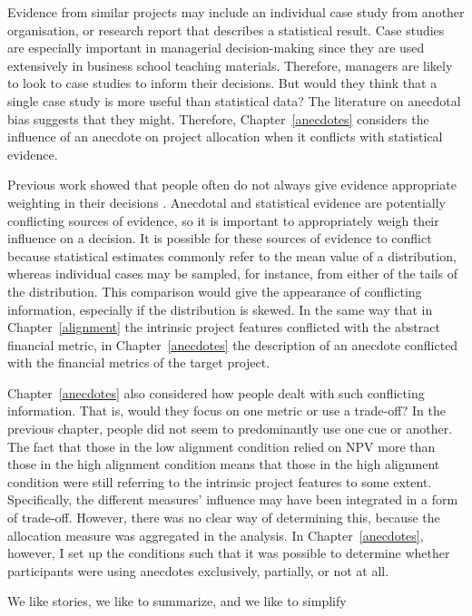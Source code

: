 \documentclass[a4paper, nobind, dvipsnames]{templates/ociamthesis}
\theoremstyle{definition}
\theoremstyle{definition}
\theoremstyle{definition}
\theoremstyle{definition}
\theoremstyle{remark}
\begin{document}
Evidence from similar projects may include an individual case study from another
organisation, or research report that describes a statistical result. Case
studies are especially important in managerial decision-making since they are
used extensively in business school teaching materials. Therefore, managers are
likely to look to case studies to inform their decisions. But would they think
that a single case study is more useful than statistical data? The literature on
anecdotal bias suggests that they might. Therefore, Chapter~\ref{anecdotes}
considers the influence of an anecdote on project allocation when it conflicts
with statistical evidence.

Previous work showed that people often do not always give evidence appropriate
weighting in their decisions \autocite{griffin1992}. Anecdotal and statistical evidence
are potentially conflicting sources of evidence, so it is important to
appropriately weigh their influence on a decision. It is possible for these
sources of evidence to conflict because statistical estimates commonly refer to
the mean value of a distribution, whereas individual cases may be sampled, for
instance, from either of the tails of the distribution. This comparison would
give the appearance of conflicting information, especially if the distribution
is skewed. In the same way that in Chapter~\ref{alignment} the intrinsic
project features conflicted with the abstract financial metric, in
Chapter~\ref{anecdotes} the description of an anecdote conflicted with the
financial metrics of the target project.

Chapter~\ref{anecdotes} also considered how people dealt with such conflicting
information. That is, would they focus on one metric or use a trade-off? In the
previous chapter, people did not seem to predominantly use one cue or another.
The fact that those in the low alignment condition relied on NPV more than those
in the high alignment condition means that those in the high alignment condition
were still referring to the intrinsic project features to some extent.
Specifically, the different measures' influence may have been integrated in a
form of trade-off. However, there was no clear way of determining this, because
the allocation measure was aggregated in the analysis. In
Chapter~\ref{anecdotes}, however, I set up the conditions such that it was
possible to determine whether participants were using anecdotes exclusively,
partially, or not at all.



\begin{savequote}
We like stories, we like to summarize, and we like to simplify
\end{savequote}
\end{document}
